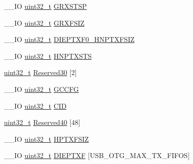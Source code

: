 \begin{DoxyCompactItemize}
\item 
\-\_\-\-\_\-\-I\-O \hyperlink{stdint_8h_a435d1572bf3f880d55459d9805097f62}{uint32\-\_\-t} \hyperlink{group___u_s_b___o_t_g___d_r_i_v_e_r_ga02cdc046ff409379b0323342a3181e3b}{G\-R\-X\-S\-T\-S\-P}
\item 
\-\_\-\-\_\-\-I\-O \hyperlink{stdint_8h_a435d1572bf3f880d55459d9805097f62}{uint32\-\_\-t} \hyperlink{group___u_s_b___o_t_g___d_r_i_v_e_r_gaec58fd028326b1f574abab5f95f6e34a}{G\-R\-X\-F\-S\-I\-Z}
\item 
\-\_\-\-\_\-\-I\-O \hyperlink{stdint_8h_a435d1572bf3f880d55459d9805097f62}{uint32\-\_\-t} \hyperlink{group___u_s_b___o_t_g___d_r_i_v_e_r_ga53e1edafd4aadb391e4583752a32d341}{D\-I\-E\-P\-T\-X\-F0\-\_\-\-H\-N\-P\-T\-X\-F\-S\-I\-Z}
\item 
\-\_\-\-\_\-\-I\-O \hyperlink{stdint_8h_a435d1572bf3f880d55459d9805097f62}{uint32\-\_\-t} \hyperlink{group___u_s_b___o_t_g___d_r_i_v_e_r_gac1bd7b9938b77197bb2c94599ba086d4}{H\-N\-P\-T\-X\-S\-T\-S}
\item 
\hyperlink{stdint_8h_a435d1572bf3f880d55459d9805097f62}{uint32\-\_\-t} \hyperlink{group___u_s_b___o_t_g___d_r_i_v_e_r_ga30233663b98834cfbc214a65f8b94339}{Reserved30} \mbox{[}2\mbox{]}
\item 
\-\_\-\-\_\-\-I\-O \hyperlink{stdint_8h_a435d1572bf3f880d55459d9805097f62}{uint32\-\_\-t} \hyperlink{group___u_s_b___o_t_g___d_r_i_v_e_r_ga6e3bfdd9ce2d01c8332866407e9e7d4e}{G\-C\-C\-F\-G}
\item 
\-\_\-\-\_\-\-I\-O \hyperlink{stdint_8h_a435d1572bf3f880d55459d9805097f62}{uint32\-\_\-t} \hyperlink{group___u_s_b___o_t_g___d_r_i_v_e_r_ga19d68aae52d7d55565b2acb97f74d366}{C\-I\-D}
\item 
\hyperlink{stdint_8h_a435d1572bf3f880d55459d9805097f62}{uint32\-\_\-t} \hyperlink{group___u_s_b___o_t_g___d_r_i_v_e_r_gad08bd7ddde680e062b2a9f274beadd6e}{Reserved40} \mbox{[}48\mbox{]}
\item 
\-\_\-\-\_\-\-I\-O \hyperlink{stdint_8h_a435d1572bf3f880d55459d9805097f62}{uint32\-\_\-t} \hyperlink{group___u_s_b___o_t_g___d_r_i_v_e_r_ga301da71393e190cdc4f3cb3c07c80d33}{H\-P\-T\-X\-F\-S\-I\-Z}
\item 
\-\_\-\-\_\-\-I\-O \hyperlink{stdint_8h_a435d1572bf3f880d55459d9805097f62}{uint32\-\_\-t} \hyperlink{group___u_s_b___o_t_g___d_r_i_v_e_r_ga61e664637457292abf91b0d35857da23}{D\-I\-E\-P\-T\-X\-F} \mbox{[}U\-S\-B\-\_\-\-O\-T\-G\-\_\-\-M\-A\-X\-\_\-\-T\-X\-\_\-\-F\-I\-F\-O\-S\mbox{]}
\end{DoxyCompactItemize}


